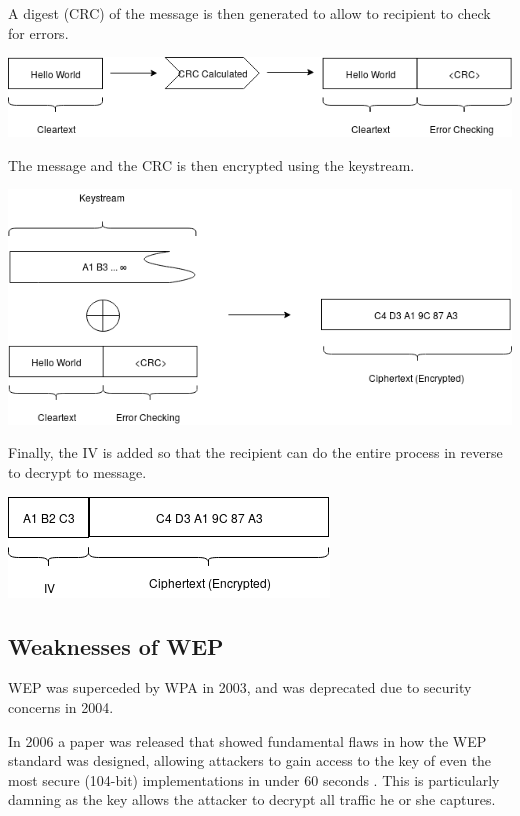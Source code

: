 \documentclass[12pt]{article}
\begin{document}
A digest (CRC) of the message is then generated to allow to recipient to check for errors.

\vspace{6px}
\centerline{\includegraphics[width=\linewidth]{res/crc.png}}

\newpage
The message and the CRC is then encrypted using the keystream.

\vspace{6px}
\centerline{\includegraphics[width=\linewidth]{res/encryption.png}}
\vspace{6px}

Finally, the IV is added so that the recipient can do the entire process in reverse to decrypt to message.

\vspace{6px}
\centerline{\includegraphics[scale=1.0]{res/header.png}}
\vspace{6px}

\subsection{Weaknesses of WEP}
WEP was superceded by WPA in 2003, and was deprecated due to security concerns in 2004. 

In 2006 a paper was released that showed fundamental flaws in how the WEP standard was designed, allowing attackers to gain access to the key of even the most secure (104-bit) implementations in under 60 seconds \citep{breakingWEP60seconds}. This is particularly damning as the key allows the attacker to decrypt all traffic he or she captures.
\end{document}
